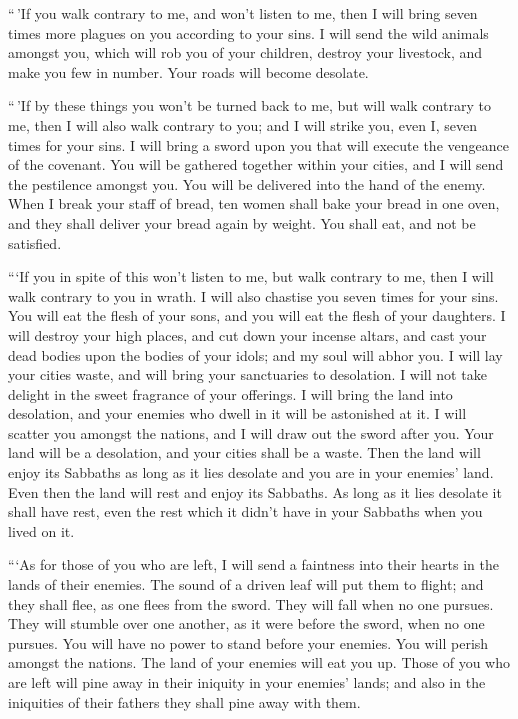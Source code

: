  ``\,'If you walk contrary to me, and won't listen to me,
then I will bring seven times more plagues on you according to your
sins.  I will send the wild animals amongst you, which will
rob you of your children, destroy your livestock, and make you few in
number. Your roads will become desolate.

 ``\,'If by these things you won't be turned back to me,
but will walk contrary to me,  then I will also walk
contrary to you; and I will strike you, even I, seven times for your
sins.  I will bring a sword upon you that will execute the
vengeance of the covenant. You will be gathered together within your
cities, and I will send the pestilence amongst you. You will be
delivered into the hand of the enemy.  When I break your
staff of bread, ten women shall bake your bread in one oven, and they
shall deliver your bread again by weight. You shall eat, and not be
satisfied.

 ```If you in spite of this won't listen to me, but walk
contrary to me,  then I will walk contrary to you in wrath.
I will also chastise you seven times for your sins.  You
will eat the flesh of your sons, and you will eat the flesh of your
daughters.  I will destroy your high places, and cut down
your incense altars, and cast your dead bodies upon the bodies of your
idols; and my soul will abhor you.  I will lay your cities
waste, and will bring your sanctuaries to desolation. I will not take
delight in the sweet fragrance of your offerings.  I will
bring the land into desolation, and your enemies who dwell in it will be
astonished at it.  I will scatter you amongst the nations,
and I will draw out the sword after you. Your land will be a desolation,
and your cities shall be a waste.  Then the land will enjoy
its Sabbaths as long as it lies desolate and you are in your enemies'
land. Even then the land will rest and enjoy its Sabbaths. 
As long as it lies desolate it shall have rest, even the rest which it
didn't have in your Sabbaths when you lived on it.

 ```As for those of you who are left, I will send a
faintness into their hearts in the lands of their enemies. The sound of
a driven leaf will put them to flight; and they shall flee, as one flees
from the sword. They will fall when no one pursues.  They
will stumble over one another, as it were before the sword, when no one
pursues. You will have no power to stand before your enemies.
 You will perish amongst the nations. The land of your
enemies will eat you up.  Those of you who are left will
pine away in their iniquity in your enemies' lands; and also in the
iniquities of their fathers they shall pine away with them.

